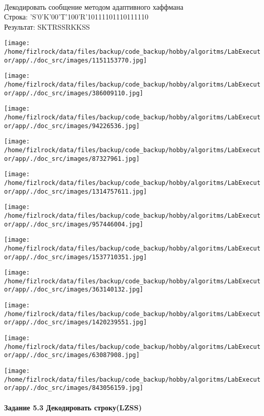 \documentclass[a4paper, 12pt]{article}
\begin{document}
\\ 

Декодировать сообщение методом адаптивного хаффмана \\
Строка: 
'S'0'K'00'T'100'R'10111101110111110\\
Результат: SKTRSSRKKSS

\texttt{[image: /home/fizlrock/data/files/backup/code\_backup/hobby/algoritms/LabExecutor/app/./doc\_src/images/1151153770.jpg]}

\texttt{[image: /home/fizlrock/data/files/backup/code\_backup/hobby/algoritms/LabExecutor/app/./doc\_src/images/386009110.jpg]}

\texttt{[image: /home/fizlrock/data/files/backup/code\_backup/hobby/algoritms/LabExecutor/app/./doc\_src/images/94226536.jpg]}

\texttt{[image: /home/fizlrock/data/files/backup/code\_backup/hobby/algoritms/LabExecutor/app/./doc\_src/images/87327961.jpg]}

\texttt{[image: /home/fizlrock/data/files/backup/code\_backup/hobby/algoritms/LabExecutor/app/./doc\_src/images/1314757611.jpg]}

\texttt{[image: /home/fizlrock/data/files/backup/code\_backup/hobby/algoritms/LabExecutor/app/./doc\_src/images/957446004.jpg]}

\texttt{[image: /home/fizlrock/data/files/backup/code\_backup/hobby/algoritms/LabExecutor/app/./doc\_src/images/1537710351.jpg]}

\texttt{[image: /home/fizlrock/data/files/backup/code\_backup/hobby/algoritms/LabExecutor/app/./doc\_src/images/363140132.jpg]}

\texttt{[image: /home/fizlrock/data/files/backup/code\_backup/hobby/algoritms/LabExecutor/app/./doc\_src/images/1420239551.jpg]}

\texttt{[image: /home/fizlrock/data/files/backup/code\_backup/hobby/algoritms/LabExecutor/app/./doc\_src/images/63087908.jpg]}

\texttt{[image: /home/fizlrock/data/files/backup/code\_backup/hobby/algoritms/LabExecutor/app/./doc\_src/images/843056159.jpg]}
\pagebreak
\paragraph{Задание 5.3 Декодировать строку(LZSS)\\}
\end{document}
